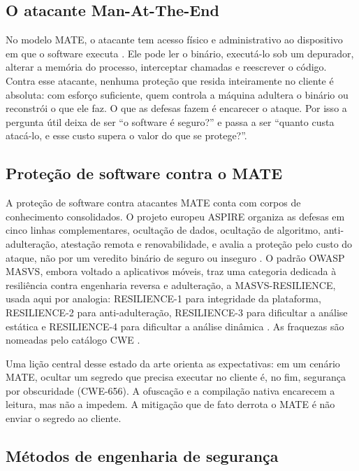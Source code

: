 \subsection{O atacante Man-At-The-End}

No modelo MATE, o atacante tem acesso físico e administrativo ao dispositivo em que o software executa \parencite{collberg2009}. Ele pode ler o binário, executá-lo sob um depurador, alterar a memória do processo, interceptar chamadas e reescrever o código. Contra esse atacante, nenhuma proteção que resida inteiramente no cliente é absoluta: com esforço suficiente, quem controla a máquina adultera o binário ou reconstrói o que ele faz. O que as defesas fazem é encarecer o ataque. Por isso a pergunta útil deixa de ser \enquote{o software é seguro?} e passa a ser \enquote{quanto custa atacá-lo, e esse custo supera o valor do que se protege?}.

\subsection{Proteção de software contra o MATE}

A proteção de software contra atacantes MATE conta com corpos de conhecimento consolidados. O projeto europeu ASPIRE organiza as defesas em cinco linhas complementares, ocultação de dados, ocultação de algoritmo, anti-adulteração, atestação remota e renovabilidade, e avalia a proteção pelo custo do ataque, não por um veredito binário de seguro ou inseguro \parencite{aspire}. O padrão OWASP MASVS, embora voltado a aplicativos móveis, traz uma categoria dedicada à resiliência contra engenharia reversa e adulteração, a MASVS-RESILIENCE, usada aqui por analogia: RESILIENCE-1 para integridade da plataforma, RESILIENCE-2 para anti-adulteração, RESILIENCE-3 para dificultar a análise estática e RESILIENCE-4 para dificultar a análise dinâmica \parencite{masvs}. As fraquezas são nomeadas pelo catálogo CWE \parencite{cwe}.

Uma lição central desse estado da arte orienta as expectativas: em um cenário MATE, ocultar um segredo que precisa executar no cliente é, no fim, segurança por obscuridade (CWE-656). A ofuscação e a compilação nativa encarecem a leitura, mas não a impedem. A mitigação que de fato derrota o MATE é não enviar o segredo ao cliente.

\subsection{Métodos de engenharia de segurança}

